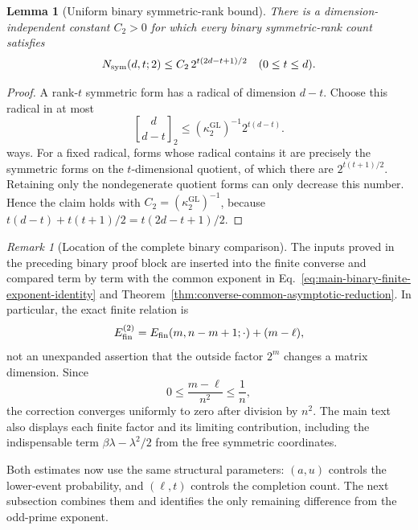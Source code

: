 \documentclass[11pt]{article}
\newcommand{\1}{\mathbf 1}
\theoremstyle{plain}
\newtheorem{lemma}[theorem]{Lemma}
\theoremstyle{definition}
\theoremstyle{remark}
\newtheorem{remark}[theorem]{Remark}
\begin{document}
\begin{lemma}[Uniform binary symmetric-rank bound]
\label{lem:integrated-binary-symmetric-rank-bound}
There is a dimension-independent constant $C_2>0$ for which every binary
symmetric-rank count satisfies
\begin{equation}
 N_{\rm sym}(d,t;2)
 \le C_2\,2^{t(2d-t+1)/2}
 \quad(0\le t\le d).
 \label{eq:integrated-binary-symmetric-rank-bound}
\end{equation}
\end{lemma}
\begin{proof}
A rank-$t$ symmetric form has a radical of dimension $d-t$.  Choose this
radical in at most
\begin{equation}
 \genfrac{[}{]}{0pt}{}{d}{d-t}_2
 \le(\kappa_2^{\mathrm{GL}})^{-1}2^{t(d-t)}.
 \label{eq:binary-symmetric-rank-radical-choice}
\end{equation}
ways.  For a fixed radical, forms whose radical contains it are precisely the
symmetric forms on the $t$-dimensional quotient, of which there are
$2^{t(t+1)/2}$.  Retaining only the nondegenerate quotient forms can only
decrease this number.  Hence the claim holds with
$C_2=(\kappa_2^{\mathrm{GL}})^{-1}$, because
$t(d-t)+t(t+1)/2=t(2d-t+1)/2$.
\end{proof}

\begin{remark}[Location of the complete binary comparison]
\label{rem:appendix-binary-comparison-location}
The inputs proved in the preceding binary proof block are inserted into the
finite converse and compared term by term with the common exponent in
Eq.~\eqref{eq:main-binary-finite-exponent-identity} and
Theorem~\ref{thm:converse-common-asymptotic-reduction}.  In
particular, the exact finite relation is
\[
 E_{\rm fin}^{(2)}=E_{\rm fin}(m,n-m+1;\cdot)+(m-\ell),
\]
not an unexpanded assertion that the outside factor $2^m$ changes a matrix
dimension.  Since
\begin{equation}
 0\le\frac{m-\ell}{n^2}\le\frac1n,
 \label{eq:binary-remark-normalized-correction}
\end{equation}
the correction converges uniformly to zero after division by $n^2$.  The main text also displays each finite factor and its limiting
contribution, including the indispensable term
$\beta\lambda-\lambda^2/2$ from the free symmetric coordinates.
\end{remark}






Both estimates now use the same structural parameters: $(a,u)$ controls the
lower-event probability, and $(\ell,t)$ controls the completion count.  The
next subsection combines them and identifies the only remaining difference
from the odd-prime exponent.
\end{document}
